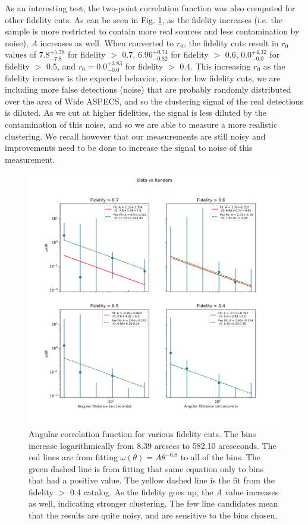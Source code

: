 As an interesting test, the two-point correlation function was also computed for other fidelity cuts. As can be seen in Fig. \ref{fig:Angular_correlation}, as the fidelity increases (i.e. the sample is more restricted to contain more real sources and less contamination by noise), $A$ increases as well. When converted to $r_0$, the fidelity cuts result in $r_0$ values of $7.8_{-7.8}^{+5.78}$ for fidelity $>$ 0.7, $6.96_{-0.82}^{+0.74}$ for fidelity $>$ 0.6, $0.0_{-0.0}^{+4.32}$ for fidelity $>$ 0.5, and $r_0 = 0.0_{-0.0}^{+3.83}$ for fidelity $>$ 0.4. This increasing $r_0$ as the fidelity increases is the expected behavior, since for low fidelity cuts, we are including more false detections (noise) that are probably randomly distributed over the area of Wide ASPECS, and so the  clustering signal of the real detections is diluted.  As we cut at higher fidelities, the signal is less diluted by the contamination of this noise, and so we are able to measure a more realistic clustering. We recall however that our measurements are still noisy and improvements need to be done to increase the signal to noise of this measurement.  

\begin{figure}[!htbp]
\centering \includegraphics[width=160mm]{FINAL_Log_4Panel_Data_Vs_Random_bin6_NFalse_Num20000.png}
\caption{Angular correlation function for various fidelity cuts. The bins increase logarithmically from 8.39 arcsecs to 582.10 arcseconds. The red lines are from fitting $\omega(\theta) = A\theta^{-0.8} $ to all of the bins. The green dashed line is from fitting that same equation only to bins that had a positive value. The yellow dashed line is the fit from the fidelity $>$ 0.4 catalog. As the fidelity goes up, the $A$ value increases as well, indicating stronger clustering. The few line candidates mean that the results are quite noisy, and are sensitive to the bins chosen.}
\label{fig:Angular_correlation}
\end{figure}

